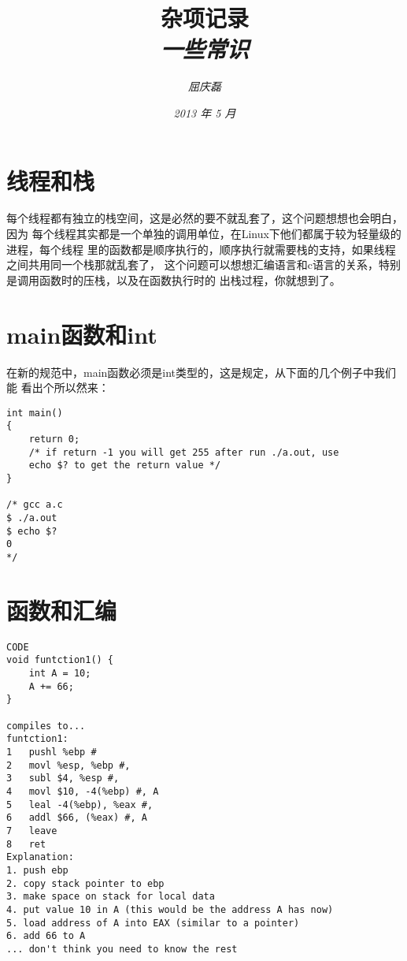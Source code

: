 \documentclass{article}
\begin{document}
\title{%
  {\huge \textsf{杂项记录}\\\smallskip}%
  {\small \textit{一些常识}}
}

\author{\textit{屈庆磊}\\[2mm]
       }

\date{\textit{2013 年 5 月}}

\maketitle
\newpage
\begin{multicols}{2}
\tableofcontents
\end{multicols}
\newpage 

\section{线程和栈}
每个线程都有独立的栈空间，这是必然的要不就乱套了，这个问题想想也会明白，因为
每个线程其实都是一个单独的调用单位，在Linux下他们都属于较为轻量级的进程，每个线程
里的函数都是顺序执行的，顺序执行就需要栈的支持，如果线程之间共用同一个栈那就乱套了，
这个问题可以想想汇编语言和c语言的关系，特别是调用函数时的压栈，以及在函数执行时的
出栈过程，你就想到了。

\section{main函数和int}
在新的规范中，main函数必须是int类型的，这是规定，从下面的几个例子中我们能
看出个所以然来：


\begin{verbatim}
int main()
{
	return 0;
	/* if return -1 you will get 255 after run ./a.out, use
	echo $? to get the return value */
}

/* gcc a.c
$ ./a.out
$ echo $?
0 
*/
\end{verbatim}

\section{函数和汇编}

\begin{verbatim}
CODE
void funtction1() {
	int A = 10;
	A += 66;
}

compiles to...
funtction1:
1	pushl %ebp #
2	movl %esp, %ebp #,
3	subl $4, %esp #,
4	movl $10, -4(%ebp) #, A
5	leal -4(%ebp), %eax #, 
6	addl $66, (%eax) #, A
7	leave
8	ret
Explanation:
1. push ebp
2. copy stack pointer to ebp
3. make space on stack for local data
4. put value 10 in A (this would be the address A has now)
5. load address of A into EAX (similar to a pointer)
6. add 66 to A
... don't think you need to know the rest
\end{verbatim}
\end{document}
